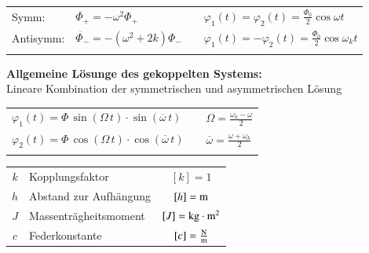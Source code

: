 \begin{tabular}{llll}
Symm: & $\ddot{\Phi_+} = - \omega^2 \Phi_+ $ & \quad &  $\varphi_1(t) = \varphi_2(t) = \frac{\Phi_0}{2} \cos{ \omega t} $\\
Antisymm: & $\ddot{\Phi_-} = - (\omega^2 + 2k) \Phi_- $ & \quad & $\varphi_1(t) = -\varphi_2(t) = \frac{\Phi_0}{2} \cos{ \omega_k t} $ \\
\\
\end{tabular}





\textbf{Allgemeine Lösunge des gekoppelten Systems:} \\
Lineare Kombination der symmetrischen und asymmetrischen Lösung \\

\renewcommand{\arraystretch}{1.3}
\begin{tabular}{lll}
$\varphi_1(t) = \Phi \, \sin( \Omega\, t) \cdot \sin(\overline{\omega} \, t)$ & & $\Omega = \frac{\omega_k - \omega}{2}$ \\
$\varphi_2(t) = \Phi \, \cos( \Omega\, t) \cdot \cos(\overline{\omega} \, t)$ & & $\overline{\omega} = \frac{\omega + \omega_k}{2}$ \\
\\
\end{tabular}
\renewcommand{\arraystretch}{1}


\begin{tabular}{c l c}
$k$ & Kopplungsfaktor & $[k] = 1$ \\
$h$ & Abstand zur Aufhängung & $[h] = \mathrm{m}$ \\
$J$ & Massenträgheitsmoment & $[J] = \mathrm{kg} \cdot \mathrm{m}^2 $ \\
$c$ & Federkonstante & $[c] = \frac{\mathrm{N}}{\mathrm{m}}$ \\
\end{tabular}


